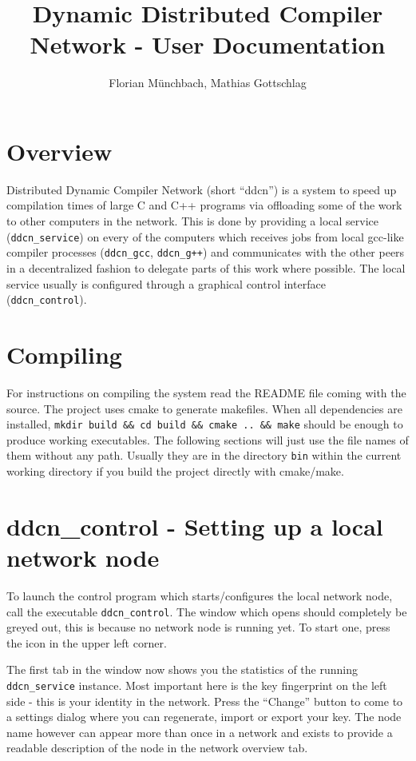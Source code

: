 \documentclass[a4paper,9pt]{scrartcl}
\title{Dynamic Distributed Compiler Network - User Documentation}
\author{Florian Münchbach, Mathias Gottschlag}
\begin{document}
\maketitle

\section{Overview}

Distributed Dynamic Compiler Network (short ``ddcn'') is a system to speed up compilation times of large C and C++ programs via offloading some of the work to other computers in the network. This is done by providing a local service (\texttt{ddcn\_service}) on every of the computers which receives jobs from local  gcc-like compiler processes (\texttt{ddcn\_gcc}, \texttt{ddcn\_g++}) and communicates with the other peers in a decentralized fashion to delegate parts of this work where possible. The local service usually is configured through a graphical control interface (\texttt{ddcn\_control}).

\section{Compiling}

For instructions on compiling the system read the README file coming with the source. The project uses cmake to generate makefiles. When all dependencies are installed, \texttt{mkdir build \&\& cd build \&\& cmake .. \&\& make} should be enough to produce working executables. The following sections will just use the file names of them without any path. Usually they are in the directory \texttt{bin} within the current working directory if you build the project directly with cmake/make.

\section{ddcn\_control - Setting up a local network node}

To launch the control program which starts/configures the local network node, call the executable \texttt{ddcn\_control}. The window which opens should completely be greyed out, this is because no network node is running yet. To start one, press the icon in the upper left corner.

The first tab in the window now shows you the statistics of the running \texttt{ddcn\_service} instance. Most important here is the key fingerprint on the left side - this is your identity in the network. Press the ``Change'' button to come to a settings dialog where you can regenerate, import or export your key. The node name however can appear more than once in a network and exists to provide a readable description of the node in the network overview tab.
\end{document}
